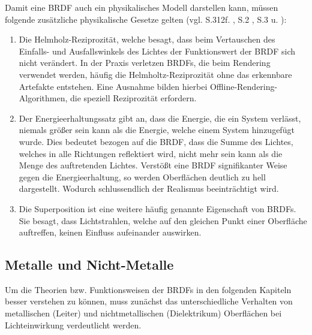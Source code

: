 \documentclass[
  11pt,
  a4paper,
  oneside
  ]{article}
\begin{document}
Damit eine BRDF auch ein physikalisches Modell darstellen kann, müssen folgende zusätz\-liche physikalische Gesetze gelten 
(vgl. S.312f. \cite{realTimeRendering4th}, S.2 \cite{uniUlm}, S.3 \cite{irrlichtOrg} u. \cite{learnOpenGL}): 
\begin{enumerate}
  \item Die Helmholz-Reziprozität, welche besagt, dass beim Vertauschen des Einfalls- und Ausfallswinkels des Lichtes der Funktionswert der BRDF sich nicht verändert. In der Praxis verletzen BRDFs, die beim Rendering verwendet werden, häufig die Helmholtz-Reziprozität ohne das erkennbare Artefakte entstehen. Eine Ausnahme bilden hierbei Offline-Rendering-Algorithmen, die speziell Reziprozität erfordern. 
  \item Der Energieerhaltungssatz gibt an, dass die Energie, die ein System verlässt, niemals größer sein kann als die Energie, welche einem System hinzugefügt wurde. Dies bedeutet bezogen auf die BRDF, dass die Summe des Lichtes, welches in alle Richtungen reflektiert wird, nicht mehr sein kann als die Menge des auftretenden Lichtes. Verstößt eine BRDF signifikanter Weise gegen die Energieerhaltung, so werden Oberflächen deutlich zu hell dargestellt. Wodurch schlussendlich der Realismus beeinträchtigt wird. 
  \item Die Superposition ist eine weitere häufig genannte Eigenschaft von BRDFs. Sie besagt, dass Lichtstrahlen, welche auf den gleichen Punkt einer Oberfläche auftreffen, keinen Einfluss aufeinander auswirken. 
\end{enumerate} 

\subsection{Metalle und Nicht-Metalle}
Um die Theorien bzw. Funktionsweisen der BRDFs in den folgenden Kapiteln besser verstehen zu können, muss zunächst das unterschiedliche Verhalten von metallischen (Leiter) und nichtmetallischen (Dielektrikum) Oberflächen bei Lichteinwirkung verdeutlicht werden.
\end{document}
